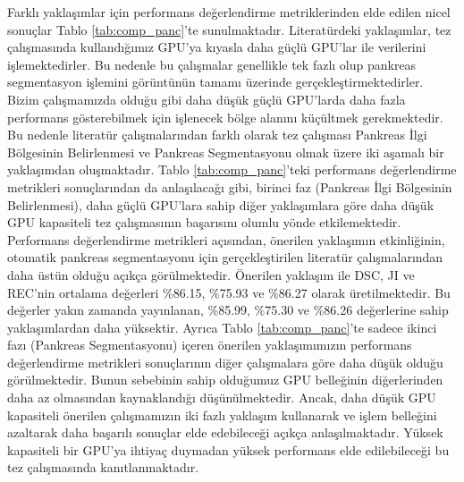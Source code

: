 Farklı yaklaşımlar için performans değerlendirme metriklerinden elde edilen nicel sonuçlar Tablo \ref{tab:comp_panc}'te sunulmaktadır. Literatürdeki yaklaşımlar, tez çalışmasında kullandığımız GPU'ya kıyasla daha güçlü GPU'lar ile verilerini işlemektedirler. Bu nedenle bu çalışmalar genellikle tek fazlı olup pankreas segmentasyon işlemini görüntünün tamamı üzerinde gerçekleştirmektedirler. Bizim çalışmamızda olduğu gibi daha düşük güçlü GPU'larda daha fazla performans gösterebilmek için işlenecek bölge alanını küçültmek gerekmektedir. Bu nedenle literatür çalışmalarından farklı olarak tez çalışması Pankreas İlgi Bölgesinin Belirlenmesi ve Pankreas Segmentasyonu olmak üzere iki aşamalı bir yaklaşımdan oluşmaktadır. Tablo \ref{tab:comp_panc}’teki performans değerlendirme metrikleri sonuçlarından da anlaşılacağı gibi, birinci faz (Pankreas İlgi Bölgesinin Belirlenmesi), daha güçlü GPU'lara sahip diğer yaklaşımlara göre daha düşük GPU kapasiteli tez çalışmasının başarısını olumlu yönde etkilemektedir. Performans değerlendirme metrikleri açısından, önerilen yaklaşımın etkinliğinin, otomatik pankreas segmentasyonu için gerçekleştirilen literatür çalışmalarından daha üstün olduğu açıkça görülmektedir. Önerilen yaklaşım ile DSC, JI ve REC'nin ortalama değerleri \%86.15, \%75.93 ve \%86.27 olarak üretilmektedir. Bu değerler yakın zamanda yayınlanan, \%85.99, \%75.30 ve \%86.26 değerlerine sahip yaklaşımlardan daha yüksektir. Ayrıca Tablo \ref{tab:comp_panc}'te sadece ikinci fazı (Pankreas Segmentasyonu) içeren önerilen yaklaşımımızın performans değerlendirme metrikleri sonuçlarının diğer çalışmalara göre daha düşük olduğu görülmektedir. Bunun sebebinin sahip olduğumuz GPU belleğinin diğerlerinden daha az olmasından kaynaklandığı düşünülmektedir. Ancak, daha düşük GPU kapasiteli önerilen çalışmamızın iki fazlı yaklaşım kullanarak ve işlem belleğini azaltarak daha başarılı sonuçlar elde edebileceği açıkça anlaşılmaktadır. Yüksek kapasiteli bir GPU'ya ihtiyaç duymadan yüksek performans elde edilebileceği bu tez çalışmasında kanıtlanmaktadır.

